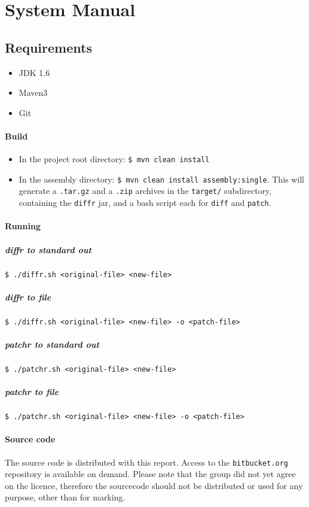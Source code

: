 \chapter{System Manual}

\section{Requirements}
\begin{itemize}
\item JDK 1.6
\item Maven3
\item Git
\end{itemize}

\subsubsection*{Build}
\begin{itemize}
\item In the project root directory: \texttt{\$ mvn clean install}
\item In the assembly directory: \texttt{\$ mvn clean install assembly:single}. This will generate a \texttt{.tar.gz} and a \texttt{.zip} archives in the \texttt{target/} subdirectory, containing the \texttt{diffr} jar, and a bash script each for \texttt{diff} and \texttt{patch}.
\end{itemize}

\subsubsection*{Running}
\paragraph{diffr to standard out} \texttt{\$ ./diffr.sh <original-file> <new-file>}
\paragraph{diffr to file} \texttt{\$ ./diffr.sh <original-file> <new-file> -o <patch-file>}

\paragraph{patchr to standard out} \texttt{\$ ./patchr.sh <original-file> <new-file>}
\paragraph{patchr to file} \texttt{\$ ./patchr.sh <original-file> <new-file> -o <patch-file>} 

\subsubsection*{Source code}
The source code is distributed with this report. Access to the \texttt{bitbucket.org} repository is available on demand. Please note that the group did not yet agree on the licence, therefore the sourcecode should not be distributed or used for any purpose, other than for marking. 

